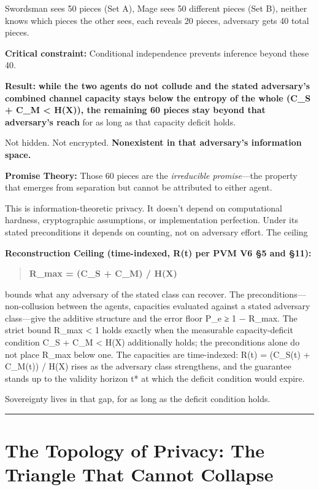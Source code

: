 \documentclass[
]{article}
\begin{document}
Swordsman sees 50 pieces (Set A), Mage sees 50 different pieces (Set B),
neither knows which pieces the other sees, each reveals 20 pieces,
adversary gets 40 total pieces.

\textbf{Critical constraint:} Conditional independence prevents
inference beyond these 40.

\textbf{Result:} \textbf{while the two agents do not collude and the
stated adversary's combined channel capacity stays below the entropy of
the whole (C\_S + C\_M \textless{} H(X)), the remaining 60 pieces stay
beyond that adversary's reach} for as long as that capacity deficit
holds.

Not hidden. Not encrypted. \textbf{Nonexistent in that adversary's
information space.}

\textbf{Promise Theory:} Those 60 pieces are the \emph{irreducible
promise}---the property that emerges from separation but cannot be
attributed to either agent.

This is information-theoretic privacy. It doesn't depend on
computational hardness, cryptographic assumptions, or implementation
perfection. Under its stated preconditions it depends on counting, not
on adversary effort. The ceiling

\textbf{Reconstruction Ceiling (time-indexed, R(t) per PVM V6 §5 and
§11):}

\begin{quote}
\textbf{R\_max = (C\_S + C\_M) / H(X)}
\end{quote}

bounds what any adversary of the stated class can recover. The
preconditions---non-collusion between the agents, capacities evaluated
against a stated adversary class---give the additive structure and the
error floor P\_e ≥ 1 − R\_max. The strict bound R\_max \textless{} 1
holds exactly when the measurable capacity-deficit condition C\_S + C\_M
\textless{} H(X) additionally holds; the preconditions alone do not
place R\_max below one. The capacities are time-indexed: R(t) = (C\_S(t)
+ C\_M(t)) / H(X) rises as the adversary class strengthens, and the
guarantee stands up to the validity horizon t* at which the deficit
condition would expire.

Sovereignty lives in that gap, for as long as the deficit condition
holds.

\begin{center}\rule{0.5\linewidth}{0.5pt}\end{center}

\section{The Topology of Privacy: The Triangle That Cannot
Collapse}\label{the-topology-of-privacy-the-triangle-that-cannot-collapse}
\end{document}

